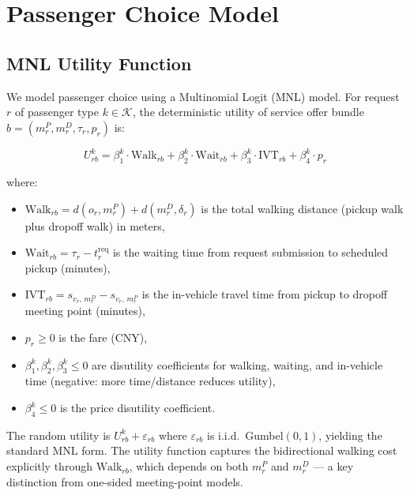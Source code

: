 \section{Passenger Choice Model}\label{sec:choice}

\subsection{MNL Utility Function}

We model passenger choice using a Multinomial Logit (MNL) model. For request $r$ of
passenger type $k \in \mathcal{K}$, the deterministic utility of service offer bundle
$b = (m_r^P, m_r^D, \tau_r, p_r)$ is:

\begin{equation}\label{eq:utility}
  U_{rb}^k = \beta_1^k \cdot \text{Walk}_{rb} + \beta_2^k \cdot \text{Wait}_{rb}
           + \beta_3^k \cdot \text{IVT}_{rb} + \beta_4^k \cdot p_r
\end{equation}

where:
\begin{itemize}
  \item $\text{Walk}_{rb} = d(o_r, m_r^P) + d(m_r^D, \delta_r)$ is the total walking
        distance (pickup walk plus dropoff walk) in meters,
  \item $\text{Wait}_{rb} = \tau_r - t_r^{\text{req}}$ is the waiting time from request
        submission to scheduled pickup (minutes),
  \item $\text{IVT}_{rb} = s_{v_r,\, m_r^D} - s_{v_r,\, m_r^P}$ is the in-vehicle travel
        time from pickup to dropoff meeting point (minutes),
  \item $p_r \geq 0$ is the fare (CNY),
  \item $\beta_1^k, \beta_2^k, \beta_3^k \leq 0$ are disutility coefficients for walking,
        waiting, and in-vehicle time (negative: more time/distance reduces utility),
  \item $\beta_4^k \leq 0$ is the price disutility coefficient.
\end{itemize}

The random utility is $U_{rb}^k + \varepsilon_{rb}$ where $\varepsilon_{rb}$ is i.i.d.\
Gumbel$(0,1)$, yielding the standard MNL form. The utility function captures the
bidirectional walking cost explicitly through $\text{Walk}_{rb}$, which depends on both
$m_r^P$ and $m_r^D$ --- a key distinction from one-sided meeting-point models.


